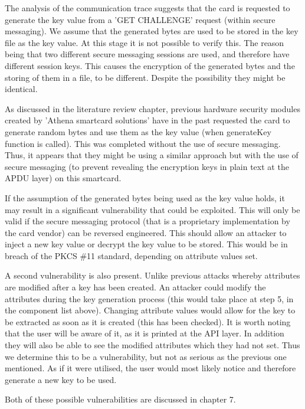 \documentclass[bsc,frontabs,twoside,singlespacing,parskip,deptreport]{infthesis}     %
\begin{document}
The analysis of the communication trace suggests that the card is requested to generate the key value from a 'GET CHALLENGE' request (within secure messaging). We assume that the generated bytes are used to be stored in the key file as the key value. At this stage it is not possible to verify this. The reason being that two different secure messaging sessions are used, and therefore have different session keys. This causes the encryption of the generated bytes and the storing of them in a file, to be different. Despite the possibility they might be identical. 

As discussed in the literature review chapter, previous hardware security modules created by 'Athena smartcard solutions' have in the past requested the card to generate random bytes and use them as the key value (when generateKey function is called). This was completed without the use of secure messaging. Thus, it appears that they might be using a similar approach but with the use of secure messaging (to prevent revealing the encryption keys in plain text at the APDU layer) on this smartcard.

If the assumption of the generated bytes being used as the key value holds, it may result in a significant vulnerability that could be exploited. This will only be valid if the secure messaging protocol (that is a proprietary implementation by the card vendor) can be reversed engineered. This should allow an attacker to inject a new key value or decrypt the key value to be stored. This would be in breach of the PKCS \#11 standard, depending on attribute values set.

A second vulnerability is also present. Unlike previous attacks whereby attributes are modified after a key has been created. An attacker could modify the attributes during the key generation process (this would take place at step 5, in the component list above). Changing attribute values would allow for the key to be extracted as soon as it is created (this has been checked). It is worth noting that the user will be aware of it, as it is printed at the API layer. In addition they will also be able to see the modified attributes which they had not set. Thus we determine this to be a vulnerability, but not as serious as the previous one mentioned. As if it were utilised, the user would most likely notice and therefore generate a new key to be used.

Both of these possible vulnerabilities are discussed in chapter 7.
\end{document}
